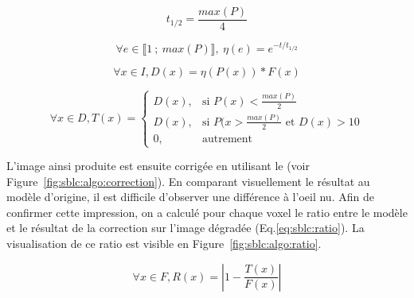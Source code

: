 \documentclass[\main/main.tex]{subfiles}
\begin{document}
\begin{equation}
    \label{eq:sblc:half}
    t_{1/2} = \frac{max(P)}{4}
\end{equation}

\begin{equation}
    \label{eq:sblc:exp}
    \forall{} e \in \llbracket 1~;~max(P) \rrbracket,~\eta(e) = e^{- t/ t_{1/2}}
\end{equation}

\begin{equation}
    \label{eq:sblc:decay}
    \forall{} x \in I, D(x) =\eta{}(P(x)) * F(x)
\end{equation}

\begin{equation}
    \label{eq:sblc:seuillage}
    \forall{} x \in D, T(x) = 
    \begin{cases}
        D(x), & \text{si } P(x) < \frac{max(P)}{2} \\
        D(x), & \text{si } P(x > \frac{max(P)}{2} \text{ et } D(x) > 10\\
        0, & \text{autrement}
    \end{cases}
\end{equation}

%
L'image ainsi produite est ensuite corrigée en utilisant le \sblc{} (voir Figure~\ref{fig:sblc:algo:correction}).
%
En comparant visuellement le résultat au modèle d'origine, il est difficile d'observer une différence à l'oeil nu.
%
Afin de confirmer cette impression, on a calculé pour chaque voxel le ratio entre le modèle et le résultat de la correction sur l'image dégradée (Eq.\eqref{eq:sblc:ratio}).
%
La visualisation de ce ratio est visible en Figure~\ref{fig:sblc:algo:ratio}.

\begin{equation}
    \label{eq:sblc:ratio}
    \forall x \in F, R(x) = \left| 1 - \frac{T(x)}{F(x)} \right|
\end{equation}
\end{document}
